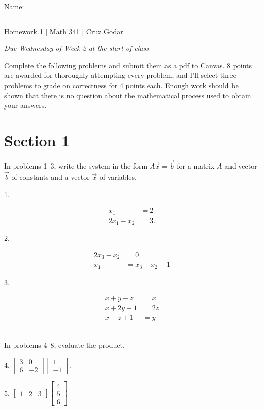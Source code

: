 \documentclass{article}
\begin{document}
\Large Name: \rule{2in}{0.15mm} \hfill Homework 1 | Math 341 | Cruz Godar \vspace{4pt}  \normalsize

\textit{Due Wednesday of Week 2 at the start of class}

Complete the following problems and submit them as a pdf to Canvas. 8 points are awarded for thoroughly attempting every problem, and I'll select three problems to grade on correctness for 4 points each. Enough work should be shown that there is no question about the mathematical process used to obtain your answers.

\section{Section 1}

In problems 1--3, write the system in the form $A\vec{x} = \vec{b}$ for a matrix $A$ and vector $\vec{b}$ of constants and a vector $\vec{x}$ of variables.

1.

\begin{align*}
	x_1 &= 2\\
	2x_1 - x_2 &= 3.
\end{align*}

2.

\begin{align*}
	2x_3 - x_2 &= 0\\
	x_1 &= x_3 - x_2 + 1
\end{align*}

3.

\begin{align*}
	x + y - z &= x\\
	x + 2y - 1 &= 2z\\
	x - z + 1 &= y
\end{align*}

~\\

In problems 4--8, evaluate the product.

4. $\displaystyle \left[\begin{array}{cc}3& 0 \\ 6& -2\end{array}\right]\left[\begin{array}{c}1 \\ -1\end{array}\right].$

5. $\displaystyle \left[\begin{array}{ccc}1& 2& 3\end{array}\right]\left[\begin{array}{c}4 \\ 5 \\ 6\end{array}\right].$
\end{document}

